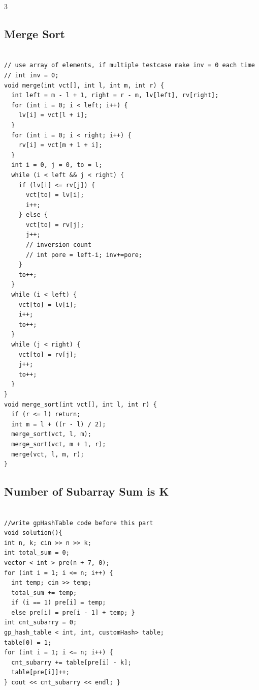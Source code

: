 \documentclass[10pt, landscape, a4paper, onesided]{extarticle}
\begin{document}
\begin{multicols*}{3}
\subsection{Merge Sort}
\begin{verbatim}

// use array of elements, if multiple testcase make inv = 0 each time
// int inv = 0;
void merge(int vct[], int l, int m, int r) {
  int left = m - l + 1, right = r - m, lv[left], rv[right];
  for (int i = 0; i < left; i++) {
    lv[i] = vct[l + i];
  }
  for (int i = 0; i < right; i++) {
    rv[i] = vct[m + 1 + i];
  }
  int i = 0, j = 0, to = l;
  while (i < left && j < right) {
    if (lv[i] <= rv[j]) {
      vct[to] = lv[i];
      i++;
    } else {
      vct[to] = rv[j];
      j++;
      // inversion count
      // int pore = left-i; inv+=pore;
    }
    to++;
  }
  while (i < left) {
    vct[to] = lv[i];
    i++;
    to++;
  }
  while (j < right) {
    vct[to] = rv[j];
    j++;
    to++;
  }
}
void merge_sort(int vct[], int l, int r) {
  if (r <= l) return;
  int m = l + ((r - l) / 2);
  merge_sort(vct, l, m);
  merge_sort(vct, m + 1, r);
  merge(vct, l, m, r);
}
\end{verbatim}

\subsection{Number of Subarray Sum is K}
\begin{verbatim}

//write gpHashTable code before this part
void solution(){
int n, k; cin >> n >> k;
int total_sum = 0;
vector < int > pre(n + 7, 0);
for (int i = 1; i <= n; i++) {
  int temp; cin >> temp;
  total_sum += temp;
  if (i == 1) pre[i] = temp;
  else pre[i] = pre[i - 1] + temp; }
int cnt_subarry = 0;
gp_hash_table < int, int, customHash> table;
table[0] = 1;
for (int i = 1; i <= n; i++) {
  cnt_subarry += table[pre[i] - k];
  table[pre[i]]++;
} cout << cnt_subarry << endl; }
\end{verbatim}


\end{multicols*}
\end{document}
